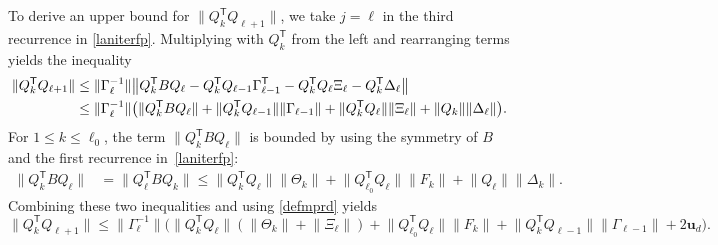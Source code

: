 \documentclass{siamart190516}
\newcommand{\Ttran}{\mathsf{T}}
\newcommand{\Ta}{\Xi}
\newcommand{\Tb}{\Gamma}
\newcommand{\mpr}{\mathbf{u}}
\providecommand{\norm}[1]{\lVert#1\rVert}
\providecommand{\bignorm}[1]{\bigl\lVert#1\bigr\rVert}
\newcommand{\edit}[1]{\textcolor{black}{#1}} %
\begin{document}
To derive an upper bound for $\norm{Q_{k}^{\Ttran}Q_{\ell+1}}$, we take $j=\ell$ in the third recurrence in \cref{laniterfp}. Multiplying with $Q_{k}^{\Ttran}$ from the left and rearranging terms yields the inequality
    \begin{align*}
        \norm{Q_{k}^{\Ttran}Q_{\ell+1}}&\leq \norm{\Gamma_{\ell}^{-1}}\bignorm{Q_{k}^{\Ttran}BQ_{\ell}-Q_{k}^{\Ttran}Q_{\ell-1}\edit{\Gamma_{\ell-1}^{\Ttran}}-Q_{k}^{\Ttran}Q_{\ell}\Ta_{\ell}-Q_{k}^{\Ttran}\Delta_{\ell}}\\ 
        &\leq \norm{\Gamma_{\ell}^{-1}}\bigl(\norm{Q_{k}^{\Ttran}BQ_{\ell}}+\norm{Q_{k}^{\Ttran}Q_{\ell-1}}\norm{\Tb_{\ell-1}}+\norm{Q_{k}^{\Ttran}Q_{\ell}}\norm{\Ta_{\ell}}+\norm{Q_{k}}\norm{\Delta_{\ell}}\bigr).
    \end{align*} 
For $1\leq k\leq \ell_{0}$, the term $\norm{Q_{k}^{\Ttran}BQ_{\ell}}$ is bounded by using the symmetry of $B$ and the first recurrence in~\cref{laniterfp}:
\begin{equation*}
    \begin{aligned}
        \norm{Q_{k}^{\Ttran}BQ_{\ell}}&=\norm{Q_{\ell}^{\Ttran}BQ_{k}}\leq \norm{Q_{k}^{\Ttran}Q_{\ell}}\norm{\Theta_{k}}+\norm{Q_{\ell_{0}}^{\Ttran}Q_{\ell}}\norm{F_{k}}+\norm{Q_{\ell}}\norm{\Delta_{k}}. 
    \end{aligned}
\end{equation*} 
Combining these two inequalities and using \cref{defmprd} yields
\begin{equation*}
    \norm{Q_{k}^{\Ttran}Q_{\ell+1}} \leq \norm{\Gamma_{\ell}^{-1}}\bigl(\norm{Q_{k}^{\Ttran}Q_{\ell}}(\norm{\Theta_{k}}+\norm{\Ta_{\ell}})+\norm{Q_{\ell_{0}}^{\Ttran}Q_{\ell}}\norm{F_{k}}+\norm{Q_{k}^{\Ttran}Q_{\ell-1}}\norm{\Tb_{\ell-1}}+2\mpr_{d}\bigr).
\end{equation*}
\end{document}
